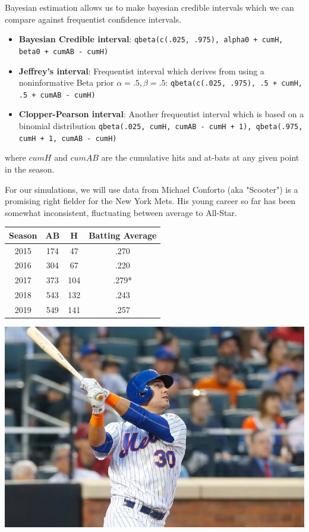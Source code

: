 \documentclass[10pt,a4paper]{article}
\begin{document}
Bayesian estimation allows us to make bayesian credible intervals which we can compare against frequentist confidence intervals. 
\begin{itemize}
	\item \textbf{Bayesian Credible interval}: \texttt{qbeta(c(.025, .975), alpha0 + cumH, beta0 + cumAB - cumH)}
	\item \textbf{Jeffrey's interval}: Frequentist interval which derives from using a noninformative Beta prior $\alpha=.5, \beta=.5$: \texttt{qbeta(c(.025, .975), .5 + cumH, .5 + cumAB - cumH)}
	\item \textbf{Clopper-Pearson interval}: Another frequentist interval which is based on a binomial distribution \texttt{qbeta(.025, cumH, cumAB - cumH + 1), qbeta(.975, cumH + 1, cumAB - cumH)}
\end{itemize}
where $cumH$ and $cumAB$ are the cumulative hits and at-bats at any given point in the season.\cite{robinson}

For our simulations, we will use data from Michael Conforto (aka "Scooter") is a promising right fielder for the New York Mets.
His young career so far has been somewhat inconsistent, fluctuating between average to All-Star.\cite{baseballreference}

\begin{minipage}{.6\textwidth}
	\begin{center}
	\begin{tabular}{|| c | c | c|  c ||}
		\hline
		Season & AB & H & Batting Average \\
		\hline
		2015 & 174 & 47 & .270 \\
		2016 & 304 & 67 & .220 \\
		2017 & 373 & 104 & .279* \\
		2018 & 543 & 132 & .243 \\
		2019 & 549 & 141 & .257 \\
		\hline
	\end{tabular}
	\end{center}
\end{minipage}
\begin{minipage}{.38\textwidth}
	\begin{center}
	\includegraphics[width=.95\textwidth]{scooter}
	\end{center}
\end{minipage}
\end{document}
